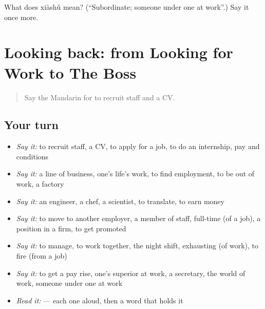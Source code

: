\begin{tcolorbox}[breakable,colback=teal!4,colframe=teal!35!black,title={Before you move on}]
What does xiàshǔ mean? (\textquotedblleft{}Subordinate; someone under one at work\textquotedblright{}.) Say it once more.
\end{tcolorbox}
\section[(dialogue)]{Looking back: from Looking for Work to The Boss}

\label{lesson:ZH-R491-review-486-491}



\begin{quote}
Say the Mandarin for to recruit staff and a CV.
\end{quote}

\subsection*{Your turn}
\begin{itemize}
\raggedright
  \item \emph{Say it:} to recruit staff, a CV, to apply for a job, to do an internship, pay and conditions
  \item \emph{Say it:} a line of business, one's life's work, to find employment, to be out of work, a factory
  \item \emph{Say it:} an engineer, a chef, a scientist, to translate, to earn money
  \item \emph{Say it:} to move to another employer, a member of staff, full-time (of a job), a position in a firm, to get promoted
  \item \emph{Say it:} to manage, to work together, the night shift, exhausting (of work), to fire (from a job)
  \item \emph{Say it:} to get a pay rise, one's superior at work, a secretary, the world of work, someone under one at work
  \item \emph{Read it:}    — each one aloud, then a word that holds it
\end{itemize}

